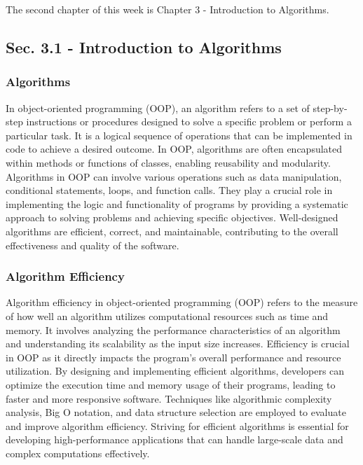 The second chapter of this week is Chapter 3 - Introduction to Algorithms.

\subsection*{Sec. 3.1 - Introduction to Algorithms}
\subsubsection*{Algorithms}

In object-oriented programming (OOP), an algorithm refers to a set of step-by-step instructions or procedures designed to solve a specific problem or perform a particular task. It is a logical sequence of operations that can be implemented in code to achieve a desired outcome. In OOP, algorithms are often encapsulated within 
methods or functions of classes, enabling reusability and modularity. Algorithms in OOP can involve various operations such as data manipulation, conditional statements, loops, and function calls. They play a crucial role in implementing the logic and functionality of programs by providing a systematic approach to solving problems 
and achieving specific objectives. Well-designed algorithms are efficient, correct, and maintainable, contributing to the overall effectiveness and quality of the software.

\subsubsection*{Algorithm Efficiency}

Algorithm efficiency in object-oriented programming (OOP) refers to the measure of how well an algorithm utilizes computational resources such as time and memory. It involves analyzing the performance characteristics of an algorithm and understanding its scalability as the input size increases. Efficiency is crucial in OOP as it 
directly impacts the program's overall performance and resource utilization. By designing and implementing efficient algorithms, developers can optimize the execution time and memory usage of their programs, leading to faster and more responsive software. Techniques like algorithmic complexity analysis, Big O notation, and data 
structure selection are employed to evaluate and improve algorithm efficiency. Striving for efficient algorithms is essential for developing high-performance applications that can handle large-scale data and complex computations effectively.

